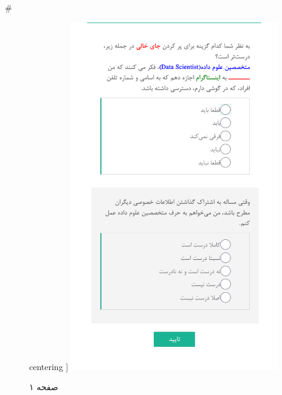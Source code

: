 { 
 # 
\begin{figure}[htpb]
centering ]
\includegraphics[width=0.8\textwidth]{./img/Task51.png/}
\caption{صفحه ۱}
\label{fig:Task1}
\end{figure}
 
}
